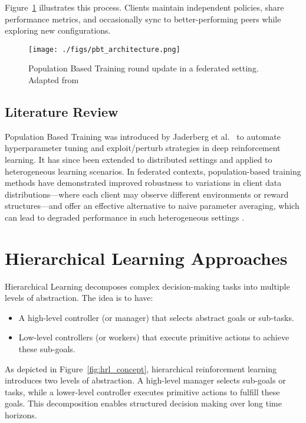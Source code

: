 \documentclass[12pt,a4paper,twoside,openany]{book}
\begin{document}
Figure~\ref{fig:pbt_architecture} illustrates this process. Clients maintain independent policies, share performance metrics, and occasionally sync to better-performing peers while exploring new configurations.

\begin{figure}[h]
\centering
\texttt{[image: ./figs/pbt\_architecture.png]}
\captionsetup{font=small}
\caption{Population Based Training round update in a federated setting. Adapted from \cite{Chen2023}}
\label{fig:pbt_architecture}
\end{figure}

\subsection*{Literature Review}

Population Based Training was introduced by Jaderberg et al.~\cite{Jaderberg2017} to automate hyperparameter tuning and exploit/perturb strategies in deep reinforcement learning. It has since been extended to distributed settings and applied to heterogeneous learning scenarios. In federated contexts, population-based training methods have demonstrated improved robustness to variations in client data distributions—where each client may observe different environments or reward structures—and offer an effective alternative to naive parameter averaging, which can lead to degraded performance in such heterogeneous settings \cite{Chen2023}. 

\section{Hierarchical Learning Approaches}

Hierarchical Learning decomposes complex decision-making tasks into multiple levels of abstraction. The idea is to have:
\begin{itemize}
    \item A high-level controller (or manager) that selects abstract goals or sub-tasks.
    \item Low-level controllers (or workers) that execute primitive actions to achieve these sub-goals.
\end{itemize}

As depicted in Figure~\ref{fig:hrl_concept}, hierarchical reinforcement learning introduces two levels of abstraction. A high-level manager selects sub-goals or tasks, while a lower-level controller executes primitive actions to fulfill these goals. This decomposition enables structured decision making over long time horizons.
\end{document}
